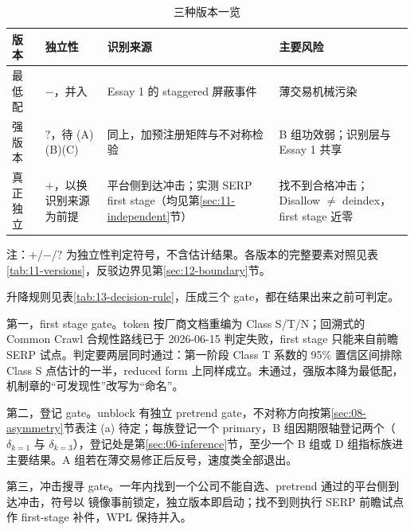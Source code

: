 \documentclass[a4paper,11pt]{ctexart}
\begin{document}
\begin{table}[htbp]
\centering
\caption{三种版本一览}\label{tab:01-versions}
\begin{threeparttable}
\small
\begin{tabular}{@{}>{\raggedright\arraybackslash}p{1.6cm}>{\raggedright\arraybackslash}p{2.6cm}>{\raggedright\arraybackslash}p{4.6cm}>{\raggedright\arraybackslash}p{4.4cm}@{}}
\toprule
版本 & 独立性 & 识别来源 & 主要风险 \\
\midrule
最低配 & $-$，并入 & Essay 1 的 staggered 屏蔽事件 & 薄交易机械污染 \\
强版本 & $?$，待 (A)(B)(C) & 同上，加预注册矩阵与不对称检验 & B 组功效弱；识别层与 Essay 1 共享 \\
真正独立 & $+$，以换识别来源为前提 & 平台侧到达冲击；实测 SERP first stage（均见第\ref{sec:11-independent}节） & 找不到合格冲击；Disallow $\neq$ deindex，first stage 近零 \\
\bottomrule
\end{tabular}
\begin{tablenotes}\footnotesize
\item 注：$+$/$-$/$?$ 为独立性判定符号，不含估计结果。各版本的完整要素对照见表\ref{tab:11-versions}，反驳边界见第\ref{sec:12-boundary}节。
\end{tablenotes}
\end{threeparttable}
\end{table}

升降规则见表\ref{tab:13-decision-rule}，压成三个 gate，都在结果出来之前可判定。

第一，first stage gate。token 按厂商文档重编为 Class S/T/N；回溯式的 Common Crawl 合规性路线已于 2026-06-15 判定失败，first stage 只能来自前瞻 SERP 试点。判定要两层同时通过：第一阶段 Class T 系数的 95\% 置信区间排除 Class S 点估计的一半，reduced form 上同样成立。未通过，强版本降为最低配，机制章的“可发现性”改写为“命名”。

第二，登记 gate。unblock 有独立 pretrend gate，不对称方向按第\ref{sec:08-asymmetry}节表注 (a) 待定\citep{merton1987,chennoronhasingal2004}；每族登记一个 primary，B 组因期限轴登记两个（$\delta_{k=1}$ 与 $\delta_{k=3}$），登记处是第\ref{sec:06-inference}节，至少一个 B 组或 D 组指标族进主要结果\citep{baiphilipponsavov2016}。A 组若在薄交易修正后反号，速度类全部退出。

第三，冲击搜寻 gate。一年内找到一个公司不能自选、pretrend 通过的平台侧到达冲击，符号以 \citet{gaohuang2020} 镜像事前锁定，独立版本即启动；找不到则执行 SERP 前瞻试点作 first-stage 补件，WPL 保持并入。
\clearpage
\end{document}
